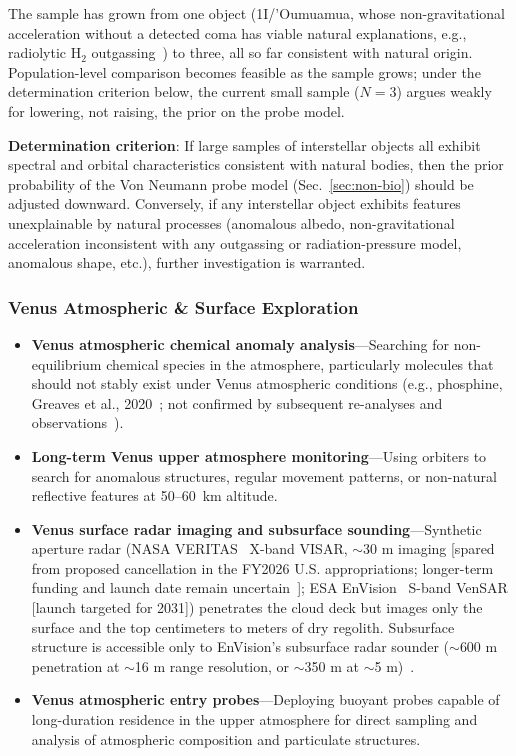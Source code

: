 \documentclass[aps,prd,twocolumn,superscriptaddress,nofootinbib]{revtex4-2}
\begin{document}
The sample has grown from one object (1I/'Oumuamua, whose non-gravitational acceleration without a detected coma has viable natural explanations, e.g., radiolytic H$_{2}$ outgassing~\cite{Bergner2023}) to three, all so far consistent with natural origin. Population-level comparison becomes feasible as the sample grows; under the determination criterion below, the current small sample ($N=3$) argues weakly for lowering, not raising, the prior on the probe model.

\textbf{Determination criterion}: If large samples of interstellar objects all exhibit spectral and orbital characteristics consistent with natural bodies, then the prior probability of the Von Neumann probe model (Sec.~\ref{sec:non-bio}) should be adjusted downward. Conversely, if any interstellar object exhibits features unexplainable by natural processes (anomalous albedo, non-gravitational acceleration inconsistent with any outgassing or radiation-pressure model, anomalous shape, etc.), further investigation is warranted.

\subsubsection{Venus Atmospheric \& Surface Exploration}\label{sec:venus-exploration}

\begin{itemize}
  \item \textbf{Venus atmospheric chemical anomaly analysis}---Searching for non-equilibrium chemical species in the atmosphere, particularly molecules that should not stably exist under Venus atmospheric conditions (e.g., phosphine, Greaves et al., 2020~\cite{Greaves2021}; not confirmed by subsequent re-analyses and observations~\cite{Snellen2020,Cordiner2022}).
  \item \textbf{Long-term Venus upper atmosphere monitoring}---Using orbiters to search for anomalous structures, regular movement patterns, or non-natural reflective features at 50--60~km altitude.
  \item \textbf{Venus surface radar imaging and subsurface sounding}---Synthetic aperture radar (NASA VERITAS~\cite{NASA_VERITAS} X-band VISAR, ${\sim}$30 m imaging [spared from proposed cancellation in the FY2026 U.S. appropriations; longer-term funding and launch date remain uncertain~\cite{Richter2026}]; ESA EnVision~\cite{ESA_EnVision} S-band VenSAR [launch targeted for 2031]) penetrates the cloud deck but images only the surface and the top centimeters to meters of dry regolith. Subsurface structure is accessible only to EnVision's subsurface radar sounder (${\sim}$600 m penetration at ${\sim}$16 m range resolution, or ${\sim}$350 m at ${\sim}$5 m)~\cite{ESA_EnVision,ESA_EnVision_VESPER}.
  \item \textbf{Venus atmospheric entry probes}---Deploying buoyant probes capable of long-duration residence in the upper atmosphere for direct sampling and analysis of atmospheric composition and particulate structures.
\end{itemize}
\end{document}
